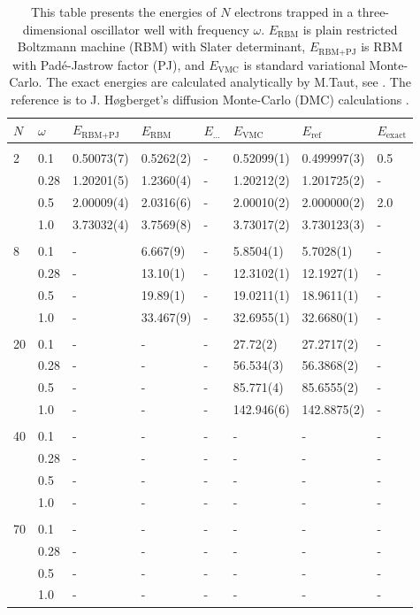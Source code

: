 \begin{table} [H]
	\caption{This table presents the energies of $N$ electrons trapped in a three-dimensional oscillator well with frequency $\omega$. $E_{\text{RBM}}$ is plain restricted Boltzmann machine (RBM) with Slater determinant, $E_{\text{RBM+PJ}}$ is RBM with Padé-Jastrow factor (PJ), and $E_{\text{VMC}}$ is standard variational Monte-Carlo. The exact energies are calculated analytically by M.Taut, see \cite{taut_two_1993}. The reference is to J. Høgberget's diffusion Monte-Carlo (DMC) calculations \cite{hogberget_quantum_2013}. } 
	\begin{tabularx}{\textwidth}{l:l|XXXXXX} \hline\hline
		\label{tab:quantumdotswinteraction3D}
		$N$ & $\omega$ & $E_{\text{RBM+PJ}}$ & $E_{\text{RBM}}$ & $E_{\text{...}}$ & $E_{\text{VMC}}$ & $E_{\text{ref}} $ & $E_{\text{exact}}$ \\ \hline \\
		2 & 0.1 & 0.50073(7) & 0.5262(2) & - & 0.52099(1) & 0.499997(3) & 0.5 \\
		& 0.28 & 1.20201(5) & 1.2360(4) & - & 1.20212(2) & 1.201725(2) & - \\
		& 0.5 & 2.00009(4) & 2.0316(6) & - & 2.00010(2) & 2.000000(2) & 2.0 \\
		& 1.0 & 3.73032(4) & 3.7569(8) & - & 3.73017(2) & 3.730123(3) & - \\ \hdashline \\
		
		8 & 0.1 & - & 6.667(9) & - & 5.8504(1) & 5.7028(1) & -\\ 
		& 0.28 & - & 13.10(1) & - & 12.3102(1) & 12.1927(1) & -\\
		& 0.5 & - & 19.89(1) & - & 19.0211(1) & 18.9611(1) & -\\
		& 1.0 & - & 33.467(9) & - & 32.6955(1) & 32.6680(1) & -\\ \hdashline \\
		
		20 & 0.1 & - & - & - & 27.72(2) & 27.2717(2) & -\\ 
		& 0.28 & - & - & - & 56.534(3) & 56.3868(2) & -\\
		& 0.5 & - & - & - & 85.771(4) & 85.6555(2) & -\\
		& 1.0 & - & - & - & 142.946(6) & 142.8875(2) & -\\ \hdashline \\
		
		40 & 0.1 & - & - & - & - & - & -\\ 
		& 0.28 & - & - & - & - & - & -\\
		& 0.5 & - & - & - & - & - & -\\
		& 1.0 & - & - & - & - & - & -\\ \hdashline \\
		
		70 & 0.1 & - & - & - & - & - & -\\ 
		& 0.28 & - & - & - & - & - & -\\
		& 0.5 & - & - & - & - & - & -\\
		& 1.0 & - & - & - & - & - & -\\ \hline\hline
	\end{tabularx}
\end{table}

